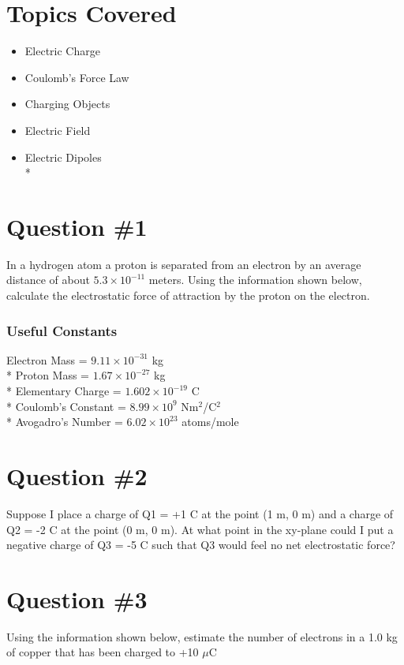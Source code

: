\documentclass[12pt]{article}
\begin{document}
\maketitle

\section*{Topics Covered}
\begin{itemize}
\item Electric Charge
\item Coulomb's Force Law
\item Charging Objects 
\item Electric Field
\item Electric Dipoles\\*
\end{itemize}

\section*{Question \#1}
In a hydrogen atom a proton is separated from an electron by an average distance of about $5.3 \times 10^{-11}$ meters.  Using the information shown below, calculate the electrostatic force of attraction by the proton on the electron.

\subsubsection*{Useful Constants}
Electron Mass = $9.11 \times 10^{-31}$ kg \\*
Proton Mass = $1.67 \times 10^{-27}$ kg \\*
Elementary Charge = $1.602 \times 10^{-19}$ C \\*
Coulomb's Constant = $8.99 \times 10^9$ Nm$^2$/C$^2$ \\*
Avogadro's Number = $ 6.02 \times 10^{23}$ atoms/mole

\section*{Question \#2}
Suppose I place a charge of Q1 = +1 C at the point (1 m, 0 m) and a charge of Q2 = -2 C at the point (0 m, 0 m).  At what point in the xy-plane could I put a negative charge of Q3 = -5 C such that Q3 would feel no net electrostatic force?

\section{Question \#3}
Using the information shown below, estimate the number of electrons in a 1.0 kg of copper that has been charged to +10 $\mu$C
\end{document}
